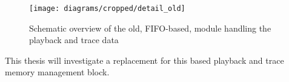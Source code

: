 \begin{figure}
\centerline{\texttt{[image: diagrams/cropped/detail\_old]}}
\caption{Schematic overview of the old, FIFO-based, module handling the playback and trace data}\label{diagram:detail_old}
\end{figure}

This thesis will investigate a replacement for this \VFIFO{} based playback and trace memory management block.
